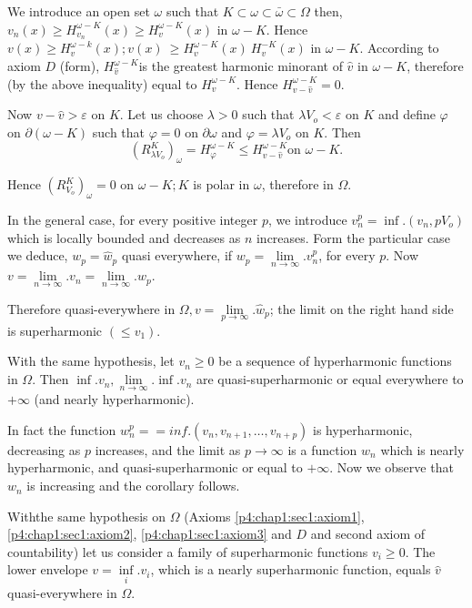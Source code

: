 We introduce an open set $\omega$ such that $K \subset \omega \subset
\bar{\omega} \subset \Omega$ then, $v_n (x) \ge H^{\omega - K}_{v_n}
(x) \ge H^{\omega - K}_v (x)$ in $\omega - K$. Hence $v(x)\geq 
H_v^{\omega-k}(x); v (x) ~\geq  H_v^{\omega-K}(x) ~ H^{-K}_v (x)$ in
$\omega-K$. According to 
axiom $D$ (form), $H^{\omega - K}_{\hat{v}}$\pageoriginale is the greatest
harmonic minorant of $\hat{v}$ in $\omega - K$, therefore (by the
above inequality) equal to $H^{\omega - K}_v$. Hence $H^{\omega -
  K}_{v  - \hat{v}} = 0$. 

Now $v - \hat{v} > \varepsilon$ on $K$. Let us choose $\lambda > 0$
such that $\lambda V_o < \varepsilon$ on $K$ and define $\varphi$ on
$\partial (\omega - K)$ such that $\varphi = 0$ on $\partial \omega$
and $\varphi = \lambda V_o $ on $K$. Then 
$$
(R^K_{\lambda V_o})_\omega = H^{\omega - K}_ \varphi \le H^{\omega -
  K}_ {v - \hat{v}} \text {on } \omega - K. 
$$

Hence $(R^K_{V_o})_\omega = 0$ on $\omega - K ; K$ is polar in
$\omega$, therefore in $\Omega$. 

In the general case, for every positive integer $p$, we introduce
$v^p_n = \inf. (v_n, p V_o)$ which is locally bounded and decreases as
$n$ increases. Form the particular case we deduce, $w_p = \hat{w}_p$
quasi everywhere, if $w_p = \lim\limits_{n \to \infty}. v^p_n$, for
every $p$. Now $v = \lim\limits_{n \to \infty}. v_n = \lim\limits_{n
  \to \infty}. w_p$. 


Therefore quasi-everywhere in $\Omega, v = \lim\limits_{p \to
  \infty}. \hat{w}_p$; the limit on the right hand side is
superharmonic $(\le v_1)$. 

\begin{coro*} 
  With the same hypothesis, let $v_n \ge 0$ be a sequence of
  hyperharmonic functions in $\Omega$. Then $\inf. v_n, \lim\limits_{n
    \to \infty}. \inf. v_n$ are quasi-superhar\-monic or equal
  everywhere to $+ \infty$ (and nearly hyperharmonic). 
\end{coro*}

In fact the function $w^p_n = =inf. (v_n, v_{n+1}, \ldots,  v_{n+p})$
is hyperharmonic, decreasing as $p$ increases, and the limit as $p \to
\infty$ is a function $w_n$ which is nearly hyperharmonic, and
quasi-superharmonic or equal to $+ \infty$. Now we observe that $w_n$
is increasing and the corollary follows. 

\begin{thm}\label{p4:chap8:sec36:thm28} 
  With\pageoriginale the same hypothesis on $\Omega$ (Axioms
  \ref{p4:chap1:sec1:axiom1}, \ref{p4:chap1:sec1:axiom2},
  \ref{p4:chap1:sec1:axiom3} and $D$ and
  second axiom of countability) let us consider a family of
  superharmonic functions $v_i \ge 0$. The lower envelope $v =
  \inf\limits_i. v_i$, which is a nearly superharmonic function, equals
  $\hat{v}$ quasi-everywhere in $\Omega$. 
\end{thm}

